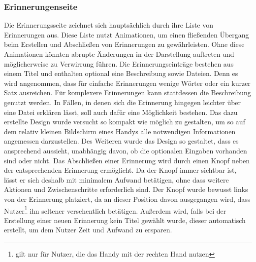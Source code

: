 \subsubsection{Erinnerungenseite}
Die Erinnerungsseite zeichnet sich hauptsächlich durch ihre Liste von Erinnerungen aus. Diese Liste nutzt Animationen, um einen fließenden Übergang beim Erstellen und Abschließen von Erinnerungen zu gewährleisten. Ohne diese Animationen könnten abrupte Änderungen in der Darstellung auftreten und möglicherweise zu Verwirrung führen.\newline%
Die Erinnerungseinträge bestehen aus einem Titel und enthalten optional eine Beschreibung sowie Dateien. %
	Denn es wird angenommen, dass für einfache Erinnerungen wenige Wörter oder ein kurzer Satz ausreichen. Für komplexere Erinnerungen kann stattdessen die Beschreibung genutzt werden. In Fällen, in denen sich die Erinnerung hingegen leichter über eine Datei erklären lässt, soll auch dafür eine Möglichkeit bestehen.\newline%
Das dazu erstellte Design wurde versucht so kompakt wie möglich zu gestalten, um so auf dem relativ kleinen Bildschirm eines Handys alle notwendigen Informationen angemessen darzustellen. %
	Des Weiteren wurde das Design so gestaltet, dass es ansprechend aussieht, unabhängig davon, ob die optionalen Eingaben vorhanden sind oder nicht.\newline%
Das Abschließen einer Erinnerung wird durch einen Knopf neben der entsprechenden Erinnerung ermöglicht. %
	Da der Knopf immer sichtbar ist, lässt er sich deshalb mit minimalem Aufwand betätigen, ohne dass weitere Aktionen und Zwischenschritte erforderlich sind. %
	Der Knopf wurde bewusst links von der Erinnerung platziert, da an dieser Position davon ausgegangen wird, dass Nutzer\footnote{gilt nur für Nutzer, die das Handy mit der rechten Hand nutzen} ihn seltener versehentlich betätigen.\newline%
Außerdem wird, falls bei der Erstellung einer neuen Erinnerung kein Titel gewählt wurde, dieser automatisch erstellt, um dem Nutzer Zeit und Aufwand zu ersparen.%
%
%
%